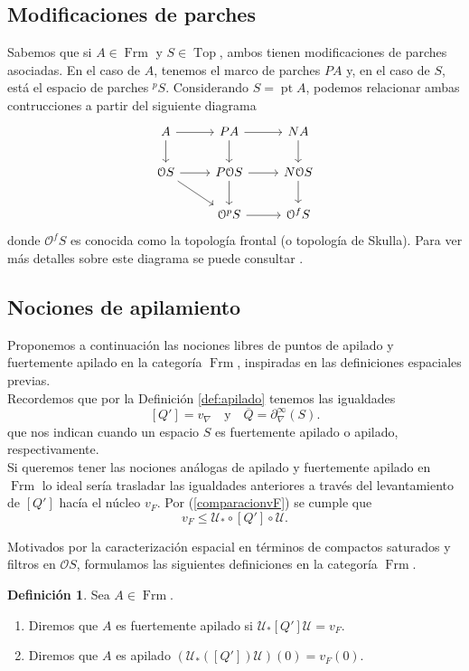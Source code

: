 \documentclass[11pt]{amsart}
\DeclareMathOperator{\pt}{pt}
\DeclareMathOperator{\Frm}{Frm}
\DeclareMathOperator{\Top}{Top}
\theoremstyle{plain}
\theoremstyle{definition}
\newtheorem{dfn}[thm]{Definición}
\begin{document}
\subsection{Modificaciones de parches}
Sabemos que si $A\in \Frm$ y $S\in \Top$, ambos tienen modificaciones de parches asociadas. En el caso de $A$, tenemos el marco de parches $PA$ 
y, en el caso de $S$, está el espacio de parches $^pS$. Considerando $S=\pt A$, podemos relacionar ambas contrucciones a partir del siguiente diagrama
\begin{equation}\label{Diagramaparches}
\begin{tikzcd}
	A & PA & NA \\
	{\mathcal{O}S} & {P\mathcal{O}S} & {N\mathcal{O}S} \\
	& {\mathcal{O}^pS} & {\mathcal{O}^fS}
	\arrow[from=1-1, to=1-2]
	\arrow[from=1-1, to=2-1]
	\arrow[from=1-2, to=1-3]
	\arrow[from=1-2, to=2-2]
	\arrow[from=1-3, to=2-3]
	\arrow[from=2-1, to=2-2]
	\arrow[from=2-1, to=3-2]
	\arrow[from=2-2, to=2-3]
	\arrow[from=2-2, to=3-2]
	\arrow[from=2-3, to=3-3]
	\arrow[from=3-2, to=3-3]
\end{tikzcd}\end{equation}
donde $\mathcal{O}^fS$ es conocida como la topología frontal (o topología de Skulla). Para ver más detalles sobre este diagrama se puede consultar
\cite{sexton2006point}.\\


\subsection{Nociones de apilamiento}
Proponemos a continuación las nociones libres de puntos de apilado y fuertemente apilado en la categoría $\Frm$, inspiradas en las
definiciones espaciales previas.\\

Recordemos que por la Definición \ref{def:apilado} tenemos las igualdades
\[
[Q']=v_\nabla\quad \text{y}\quad\overline{Q}=\partial_\nabla^\infty(S).
\]
que nos indican cuando un espacio $S$ es fuertemente apilado o apilado, respectivamente.\\

Si queremos tener las nociones análogas de apilado y fuertemente apilado en $\Frm$ lo ideal sería trasladar las igualdades anteriores
a través del levantamiento de $[Q']$ hacía el núcleo $v_F$. Por (\ref{comparacionvF}) se cumple que 
\[
v_F\leq \mathcal{U}_*\circ [Q']\circ \mathcal{U}.
\]

Motivados por la caracterización espacial en términos de compactos saturados y filtros en $\mathcal{O}S$, formulamos las siguientes definiciones
en la categoría $\Frm$. 
\begin{dfn}\label{def:apilado-marcos}
Sea $A\in \Frm$.
\begin{enumerate}
  \item Diremos que $A$ es fuertemente apilado si $\mathcal{U}_*[Q']\mathcal{U}=v_F$.
  \item Diremos que $A$ es apilado $(\mathcal{U}_*([Q'])\mathcal{U})(0)=v_F(0)$.
\end{enumerate}
\end{dfn}
\end{document}
